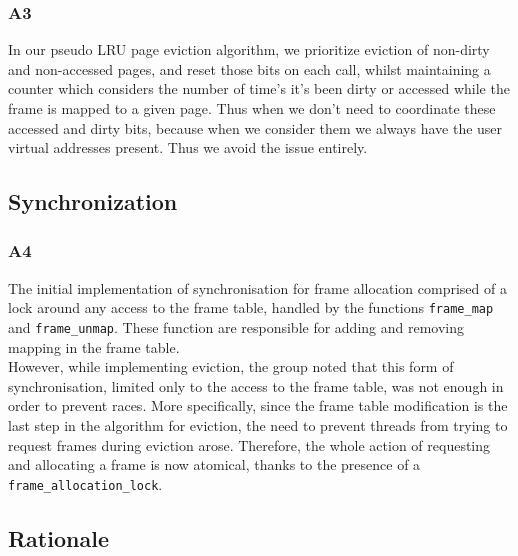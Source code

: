 \documentclass[a4wide, 11pt]{article}
\newcommand{\tx}{\texttt}
\begin{document}
\subsubsection{A3}

In our pseudo LRU page eviction algorithm, we prioritize eviction of non-dirty and non-accessed pages, and reset those bits on each call, whilst maintaining a counter which considers the number of time's it's been dirty or accessed while the frame is mapped to a given page. Thus when we don't need to coordinate these accessed and dirty bits, because when we consider them we always have the user virtual addresses present. Thus we avoid the issue entirely.

\subsection{Synchronization}
\subsubsection{A4}
The initial implementation of synchronisation for frame allocation comprised of a lock around any access to the frame table, handled  by the functions \tx{frame\_map} and \tx{frame\_unmap}. These function are responsible for adding and removing mapping in the frame table. \\
However, while implementing eviction, the group noted that this form of synchronisation, limited only to the access to the frame table, was not enough in order to prevent races. More specifically, since the frame table modification is the last step in the algorithm for eviction, the need to prevent threads from trying to request frames during eviction arose. Therefore, the whole action of requesting and allocating a frame is now atomical, thanks to the presence of a \tx{frame\_allocation\_lock}.
\subsection{Rationale}
\end{document}
